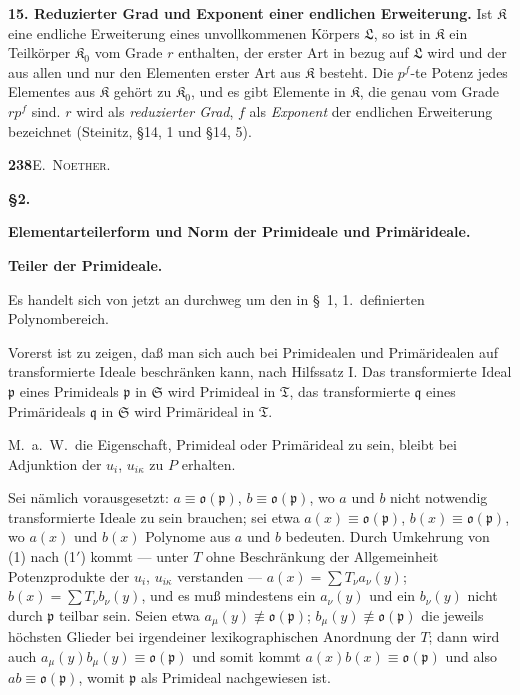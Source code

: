 \documentclass[12pt,a4paper]{article}
\begin{document}
{{\textbf{15. Reduzierter Grad und Exponent einer endlichen Erweiterung.}
Ist $\mathfrak{K}$ eine endliche Erweiterung eines unvollkommenen K\"{o}rpers $\mathfrak{L}$, so
ist in $\mathfrak{K}$ ein Teilk\"{o}rper $\mathfrak{K}_{0}$ vom Grade $r$ enthalten, der erster Art in
bezug auf $\mathfrak{L}$ wird und der aus allen und nur den Elementen erster Art
aus $\mathfrak{K}$ besteht. Die $p^{f}$-te Potenz jedes Elementes aus $\mathfrak{K}$ geh\"{o}rt zu
$\mathfrak{K}_{0}$, und es gibt Elemente in $\mathfrak{K}$, die genau vom Grade $rp^{f}$ sind.
$r$ wird als \textit{reduzierter Grad}, $f$ als \textit{Exponent} der endlichen Erweiterung
bezeichnet (Steinitz, \S 14, 1 und \S 14, 5).

\newpage
\begin{center}
\textbf{238}\quad\textsc{E.~Noether.}
\end{center}

\medskip
\noindent\textbf{\S 2.}
\medskip

\noindent\textbf{Elementarteilerform und Norm der Primideale und Prim\"{a}rideale.}
\medskip

\noindent\textbf{Teiler der Primideale.}

Es handelt sich von jetzt an durchweg um den in \S~1, 1.\ definierten
Polynombereich.

Vorerst ist zu zeigen, da{\ss} man sich auch bei Primidealen
und Prim\"{a}ridealen auf transformierte Ideale beschr\"{a}nken kann, nach
Hilfssatz I. Das transformierte Ideal $\mathfrak{p}$ eines Primideals $\mathfrak{p}$ in $\mathfrak{S}$
wird Primideal in $\mathfrak{T}$, das transformierte $\mathfrak{q}$ eines Prim\"{a}rideals $\mathfrak{q}$ in $\mathfrak{S}$ wird
Prim\"{a}rideal in $\mathfrak{T}$.

M.~a.~W.~die Eigenschaft, Primideal oder Prim\"{a}rideal zu sein,
bleibt bei Adjunktion der $u_{i}$, $u_{i\kappa}$ zu $P$ erhalten.

Sei n\"{a}mlich vorausgesetzt: $a\equiv\mathfrak{o}(\mathfrak{p})$, $b\equiv\mathfrak{o}(\mathfrak{p})$, wo $a$ und $b$ nicht
notwendig transformierte Ideale zu sein brauchen; sei etwa $a(x)\equiv\mathfrak{o}(\mathfrak{p})$,
$b(x)\equiv\mathfrak{o}(\mathfrak{p})$, wo $a(x)$ und $b(x)$ Polynome aus $a$ und $b$ bedeuten.
Durch Umkehrung von (1) nach (1$'$) kommt --- unter $T$ ohne Beschr\"{a}nkung
der Allgemeinheit Potenzprodukte der $u_{i}$, $u_{i\kappa}$ verstanden ---
$a(x)=\sum T_{\nu}a_{\nu}(y)$; $b(x)=\sum T_{\nu}b_{\nu}(y)$,
und es mu{\ss} mindestens ein $a_{\nu}(y)$ und ein $b_{\nu}(y)$ nicht durch $\mathfrak{p}$ teilbar
sein. Seien etwa $a_{\mu}(y)\not\equiv\mathfrak{o}(\mathfrak{p})$; $b_{\mu}(y)\not\equiv\mathfrak{o}(\mathfrak{p})$ die jeweils h\"{o}chsten Glieder
bei irgendeiner lexikographischen Anordnung der $T$; dann wird auch
$a_{\mu}(y)b_{\mu}(y)\equiv\mathfrak{o}(\mathfrak{p})$ und somit kommt $a(x)b(x)\equiv\mathfrak{o}(\mathfrak{p})$ und also $ab\equiv\mathfrak{o}(\mathfrak{p})$,
womit $\mathfrak{p}$ als Primideal nachgewiesen ist.

}}
\end{document}
